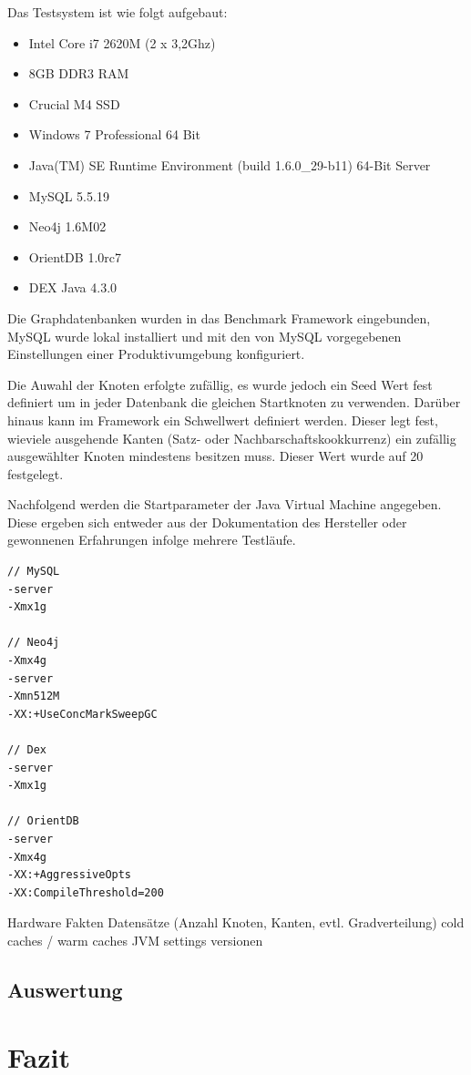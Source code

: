 \documentclass[11pt, a4paper, oneside]{article} %
\begin{document}
Das Testsystem ist wie folgt aufgebaut: 
\begin{itemize}
	\item Intel Core i7 2620M (2 x 3,2Ghz)
	\item 8GB DDR3 RAM
	\item Crucial M4 SSD
	\item Windows 7 Professional 64 Bit
	\item Java(TM) SE Runtime Environment (build 1.6.0\_{}29-b11) 64-Bit Server
	\item MySQL 5.5.19
	\item Neo4j 1.6M02
	\item OrientDB 1.0rc7
	\item DEX Java 4.3.0
\end{itemize}
Die Graphdatenbanken wurden in das Benchmark Framework eingebunden, MySQL wurde lokal installiert und mit den von MySQL vorgegebenen Einstellungen einer Produktivumgebung konfiguriert.
\par
Die Auwahl der Knoten erfolgte zufällig, es wurde jedoch ein Seed Wert fest definiert um in jeder Datenbank die gleichen Startknoten zu verwenden. Darüber hinaus kann im Framework ein Schwellwert definiert werden. Dieser legt fest, wieviele ausgehende Kanten (Satz- oder Nachbarschaftskookkurrenz) ein zufällig ausgewählter Knoten mindestens besitzen muss. Dieser Wert wurde auf 20 festgelegt.
\par
Nachfolgend werden die Startparameter der Java Virtual Machine angegeben. Diese ergeben sich entweder aus der Dokumentation des Hersteller oder gewonnenen Erfahrungen infolge mehrere Testläufe.

\begin{lstlisting}
// MySQL
-server
-Xmx1g

// Neo4j
-Xmx4g
-server
-Xmn512M
-XX:+UseConcMarkSweepGC

// Dex
-server
-Xmx1g

// OrientDB
-server
-Xmx4g
-XX:+AggressiveOpts 
-XX:CompileThreshold=200
\end{lstlisting}


Hardware Fakten
Datensätze (Anzahl Knoten, Kanten, evtl. Gradverteilung)
cold caches / warm caches
JVM settings
versionen

\subsection{Auswertung}

\section{Fazit}
\end{document}
